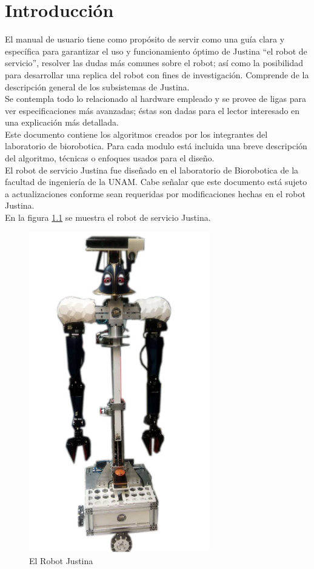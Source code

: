 \documentclass[user_manual.tex]{subfiles}
\begin{document}
\chapter{Introducción}

El manual de usuario tiene como propósito de servir como una guía clara y específica para garantizar el uso y funcionamiento óptimo de Justina ``el robot de servicio'', resolver las dudas más comunes sobre el robot; así como la posibilidad para desarrollar una replica del robot con fines de investigación. Comprende de la descripción general de los subsistemas de Justina.\\

Se contempla todo lo relacionado al hardware empleado y se provee de ligas para ver especificaciones más avanzadas; éstas son dadas para el lector interesado en una explicación más detallada.\\

Este documento contiene los algoritmos creados por los integrantes del laboratorio de biorobotica. Para cada modulo está incluida una breve descripción del algoritmo, técnicas o enfoques usados para el diseño.\\ %

El robot de servicio Justina fue diseñado en el laboratorio de Biorobotica de la facultad de ingeniería de la UNAM. Cabe señalar que este documento está sujeto a actualizaciones conforme sean requeridas por modificaciones hechas en el robot Justina.\\

En la figura \ref{fig:introduction:Justina} se muestra el robot de servicio Justina.

\begin{figure}[H]
\centering
\includegraphics[width=0.7\textwidth]{Figures/Introduction/Justina.png}
\caption{El Robot Justina}
\label{fig:introduction:Justina}
\end{figure}
\pagebreak
\end{document}
